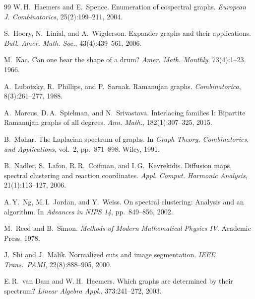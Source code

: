 \documentclass[12pt,letterpaper]{article}
\begin{document}
\begin{thebibliography}{99}
W.\,H.~Haemers and E.~Spence.
\newblock Enumeration of cospectral graphs.
\newblock \emph{European J. Combinatorics}, 25(2):199--211, 2004.

S.~Hoory, N.~Linial, and A.~Wigderson.
\newblock Expander graphs and their applications.
\newblock \emph{Bull. Amer. Math. Soc.}, 43(4):439--561, 2006.

M.~Kac.
\newblock Can one hear the shape of a drum?
\newblock \emph{Amer. Math. Monthly}, 73(4):1--23, 1966.

A.~Lubotzky, R.~Phillips, and P.~Sarnak.
\newblock Ramanujan graphs.
\newblock \emph{Combinatorica}, 8(3):261--277, 1988.

A.~Marcus, D.\,A.~Spielman, and N.~Srivastava.
\newblock Interlacing families I: Bipartite Ramanujan graphs of all degrees.
\newblock \emph{Ann. Math.}, 182(1):307--325, 2015.

B.~Mohar.
\newblock The Laplacian spectrum of graphs.
\newblock In \emph{Graph Theory, Combinatorics, and Applications}, vol.~2, pp.~871--898. Wiley, 1991.

B.~Nadler, S.~Lafon, R.\,R.~Coifman, and I.\,G.~Kevrekidis.
\newblock Diffusion maps, spectral clustering and reaction coordinates.
\newblock \emph{Appl. Comput. Harmonic Analysis}, 21(1):113--127, 2006.

A.\,Y.~Ng, M.\,I.~Jordan, and Y.~Weiss.
\newblock On spectral clustering: Analysis and an algorithm.
\newblock In \emph{Advances in NIPS 14}, pp.~849--856, 2002.

M.~Reed and B.~Simon.
\newblock \emph{Methods of Modern Mathematical Physics IV}.
\newblock Academic Press, 1978.

J.~Shi and J.~Malik.
\newblock Normalized cuts and image segmentation.
\newblock \emph{IEEE Trans.\ PAMI}, 22(8):888--905, 2000.

E.\,R.~van Dam and W.\,H.~Haemers.
\newblock Which graphs are determined by their spectrum?
\newblock \emph{Linear Algebra Appl.}, 373:241--272, 2003.

\end{thebibliography}
\end{document}
